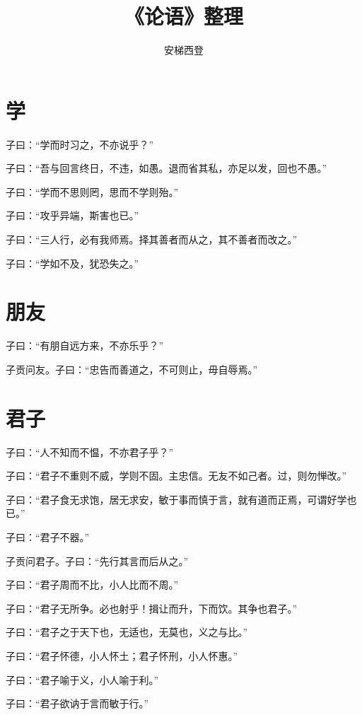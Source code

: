 \documentclass[a5paper]{ctexbook}
\title{《论语》整理}
\author{安梯西登}
\date{}
\begin{document}
    \maketitle

    \tableofcontents

    \chapter{学}

    子曰：“学而时习之，不亦说乎？”

    子曰：“吾与回言终日，不违，如愚。退而省其私，亦足以发，回也不愚。”

    子曰：“学而不思则罔，思而不学则殆。”

    子曰：“攻乎异端，斯害也已。”

    子曰：“三人行，必有我师焉。择其善者而从之，其不善者而改之。”

    子曰：“学如不及，犹恐失之。”

    \chapter{朋友}

    子曰：“有朋自远方来，不亦乐乎？”

    子贡问友。子曰：“忠告而善道之，不可则止，毋自辱焉。”

    \chapter{君子}
    
    子曰：“人不知而不愠，不亦君子乎？”

    子曰：“君子不重则不威，学则不固。主忠信。无友不如己者。过，则勿惮改。”

    子曰：“君子食无求饱，居无求安，敏于事而慎于言，就有道而正焉，可谓好学也已。”

    子曰：“君子不器。”
    
    子贡问君子。子曰：“先行其言而后从之。”
    
    子曰：“君子周而不比，小人比而不周。”

    子曰：“君子无所争。必也射乎！揖让而升，下而饮。其争也君子。”

    子曰：“君子之于天下也，无适也，无莫也，义之与比。”

    子曰：“君子怀德，小人怀土；君子怀刑，小人怀惠。”

    子曰：“君子喻于义，小人喻于利。”

    子曰：“君子欲讷于言而敏于行。”
\end{document}
